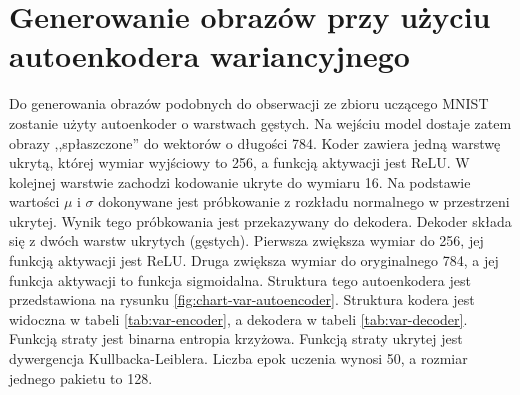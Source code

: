 \documentclass[12pt]{mwbk}
\theoremstyle{plain}
\theoremstyle{definition}
\theoremstyle{remark}
\newcommand\zrodlo[1]{\par\vspace{-3mm}{\small\textit{Źródło: }#1 }}
\begin{document}
\section{Generowanie obrazów przy użyciu autoenkodera wariancyjnego}

Do generowania obrazów podobnych do obserwacji ze zbioru uczącego MNIST zostanie użyty autoenkoder o warstwach gęstych. Na wejściu model dostaje zatem obrazy ,,spłaszczone'' do wektorów o długości 784. Koder zawiera jedną warstwę ukrytą, której wymiar wyjściowy to 256, a funkcją aktywacji jest ReLU. W kolejnej warstwie zachodzi kodowanie ukryte do wymiaru 16. Na podstawie wartości $\mu$ i $\sigma$ dokonywane jest próbkowanie z rozkładu normalnego w przestrzeni ukrytej. Wynik tego próbkowania jest przekazywany do dekodera. Dekoder składa się z dwóch warstw ukrytych (gęstych). Pierwsza zwiększa wymiar do 256, jej funkcją aktywacji jest ReLU. Druga zwiększa wymiar do oryginalnego 784, a jej funkcja aktywacji to funkcja sigmoidalna. Struktura tego autoenkodera jest przedstawiona na rysunku \ref{fig:chart-var-autoencoder}. Struktura kodera jest widoczna w tabeli \ref{tab:var-encoder}, a dekodera w tabeli \ref{tab:var-decoder}. Funkcją straty jest binarna entropia krzyżowa. Funkcją straty ukrytej jest dywergencja Kullbacka-Leiblera. Liczba epok uczenia wynosi 50, a rozmiar jednego pakietu to 128.

\end{document}
